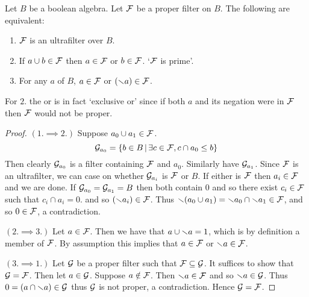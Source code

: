 \begin{prop}
    Let $B$ be a boolean algebra. 
    Let $\mathcal{F}$ be a proper filter on $B$.
    The following are equivalent:
    \begin{enumerate}
        \item $\mathcal{F}$ is an ultrafilter over $B$.
        \item If $a \cup b \in \mathcal{F}$ then $a \in \mathcal{F}$ or $b \in \mathcal{F}$.
            `$\mathcal{F}$ is prime'.
        \item For any $a$ of $B$, 
            $a \in \mathcal{F}$ or $(\smallsetminus a) \in \mathcal{F}$.
    \end{enumerate}
    For $2.$ the or is in fact `exclusive or' since if both $a$ 
    and its negation were in $\mathcal{F}$ then $\mathcal{F}$ would not be proper.
\end{prop}
\begin{proof}
    $(1. \implies 2.)$
        Suppose $a_0 \cup a_1 \in \mathcal{F}$.
        \[\mathcal{G}_{a_0} = \left\{b \in B \,|\, \exists c \in \mathcal{F}, c \cap a_0 \leq b\right\}\]
        Then clearly $\mathcal{G}_{a_0}$ is a filter containing $\mathcal{F}$ and $a_0$.
        Similarly have $\mathcal{G}_{a_1}$.
        Since $\mathcal{F}$ is an ultrafilter, 
        we can case on whether $\mathcal{G}_{a_i}$ is $\mathcal{F}$ or $B$.
        If either is $\mathcal{F}$ then $a_i \in \mathcal{F}$ and we are done.
        If $\mathcal{G}_{a_0} = \mathcal{G}_{a_1} = B$ then both contain $0$ and so 
        there exist $c_i \in \mathcal{F}$ such that 
        $c_i \cap a_i = 0$.
        and so $(\smallsetminus a_i) \in \mathcal{F}$.
        Thus $\smallsetminus (a_0 \cup a_1) = \smallsetminus a_0 \cap \smallsetminus a_1 \in \mathcal{F}$,
        and so $0 \in \mathcal{F}$,
        a contradiction.

    $(2. \implies 3.)$ 
        Let $a \in \mathcal{F}$.
        Then we have that $a \cup \smallsetminus a = 1$, 
        which is by definition a member of $\mathcal{F}$.
        By assumption this implies that $a \in \mathcal{F}$ or $\smallsetminus a \in \mathcal{F}$.
    
    $(3. \implies 1.)$
        Let $\mathcal{G}$ be a proper filter such that $\mathcal{F} \subseteq \mathcal{G}$.
        It suffices to show that $\mathcal{G} = \mathcal{F}$.
        Then let $a \in \mathcal{G}$.
        Suppose $a \notin \mathcal{F}$.
        Then $\smallsetminus a \in \mathcal{F}$ and so $\smallsetminus a \in \mathcal{G}$.
        Thus $0 = (a \cap \smallsetminus a) \in \mathcal{G}$ 
        thus $\mathcal{G}$ is not proper, a contradiction.
        Hence $\mathcal{G} = \mathcal{F}$.
\end{proof}

\begin{prop}
\end{prop}


